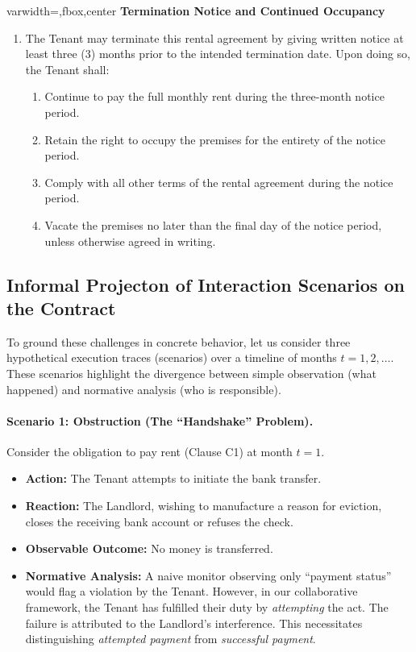 \documentclass{article}
\begin{document}
\begin{example}
\begin{adjustbox}{varwidth=\textwidth,fbox,center}
    \textbf{Termination Notice and Continued Occupancy}
    \begin{enumerate}[label={(C\arabic*)},resume]
    \item The Tenant may terminate this rental agreement by giving written notice at least three (3) months prior to the intended termination date. Upon doing so, the Tenant shall:
    \begin{enumerate}[label={(\roman*)}]
    \item Continue to pay the full monthly rent during the three-month notice period.
    \item Retain the right to occupy the premises for the entirety of the notice period.
    \item Comply with all other terms of the rental agreement during the notice period.
    \item Vacate the premises no later than the final day of the notice period, unless otherwise agreed in writing.
    \end{enumerate}
    \end{enumerate}
    \end{adjustbox}
    \end{example}
  
    \subsection*{Informal Projecton of Interaction Scenarios on the Contract}
    To ground these challenges in concrete behavior, let us consider three hypothetical execution traces (scenarios) over a timeline of months $t=1, 2, \dots$.
    These scenarios highlight the divergence between simple observation (what happened) and normative analysis (who is responsible).
    
    \paragraph{Scenario 1: Obstruction (The ``Handshake'' Problem).}
    Consider the obligation to pay rent (Clause C1) at month $t=1$.
    \begin{itemize}
        \item \textbf{Action:} The Tenant attempts to initiate the bank transfer.
        \item \textbf{Reaction:} The Landlord, wishing to manufacture a reason for eviction, closes the receiving bank account or refuses the check.
        \item \textbf{Observable Outcome:} No money is transferred.
        \item \textbf{Normative Analysis:} A naive monitor observing only ``payment status'' would flag a violation by the Tenant. However, in our collaborative framework, the Tenant has fulfilled their duty by \emph{attempting} the act. The failure is attributed to the Landlord's interference. This necessitates distinguishing \emph{attempted payment} from \emph{successful payment}.
    \end{itemize}
    
\end{document}
